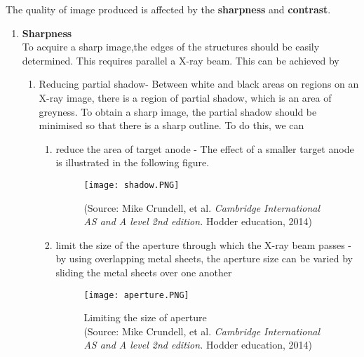 \documentclass{article}
\begin{document}
The quality of image produced is affected by the \textbf{sharpness} and \textbf{ contrast}. 
\begin{enumerate}
    \item \textbf{Sharpness}
    \\To acquire a sharp image,the edges of the structures should be easily determined. This requires parallel a X-ray beam. This can be achieved by 
    \begin{enumerate}
        \item Reducing partial shadow- Between white and black areas on regions on an X-ray image, there is a region of partial shadow, which is an area of greyness. To obtain a sharp image, the partial shadow should be minimised so that there is a sharp outline. 
        To do this, we can 
        \begin{enumerate}
            \item reduce the area of target anode - The effect of a smaller target anode is illustrated in the following figure.
            \begin{figure}[H]
                \centering
                \captionsetup{justification=centering,margin=2cm}
                \texttt{[image: shadow.PNG]}
                \caption*{(Source: Mike Crundell, et al. \textit{Cambridge International AS and A level 2nd edition.} Hodder education, 2014)}
            \end{figure} 
            \newpage
            \item limit the size of the aperture through which the X-ray beam passes - by using overlapping metal sheets, the aperture size can be varied by sliding the metal sheets over one another
            \begin{figure}[H]
                \centering
                \captionsetup{justification=centering,margin=2cm}
                \texttt{[image: aperture.PNG]}
                \caption*{Limiting the size of aperture \\ (Source: Mike Crundell, et al. \textit{Cambridge International AS and A level 2nd edition.} Hodder education, 2014)}
            \end{figure}
        \end{enumerate}


\end{enumerate}
\end{enumerate}
\end{document}
